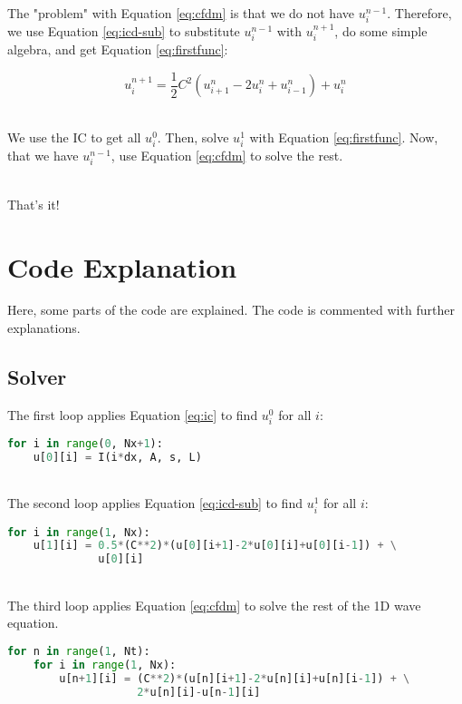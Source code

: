 \documentclass{article}
\begin{document}
\noindent\\The "problem" with Equation \ref{eq:cfdm} is that we do not have $u_i^{n-1}$. Therefore, we use Equation \ref{eq:icd-sub} to substitute $u_i^{n-1}$ with $u_i^{n+1}$, do some simple algebra, and get Equation \ref{eq:firstfunc}:

\begin{equation}
    u_i^{n+1}=\frac{1}{2}C^2\left(u_{i+1}^n-2u_i^n+u_{i-1}^n\right)+u_i^n
    \label{eq:firstfunc}
\end{equation}

\noindent\\We use the IC to get all $u_i^0$. Then, solve $u_i^{1}$ with Equation \ref{eq:firstfunc}. Now, that we have $u_i^{n-1}$, use Equation \ref{eq:cfdm} to solve the rest.

\noindent\\That's it!

\newpage
\section{Code Explanation}
Here, some parts of the code are explained. The code is commented with further explanations.

\subsection{Solver}
The first loop applies Equation \ref{eq:ic} to find $u_i^0$ for all $i$:

\begin{lstlisting}[language=Python, caption=Initial Condition]
for i in range(0, Nx+1):
    u[0][i] = I(i*dx, A, s, L)
\end{lstlisting}

\noindent\\The second loop applies Equation \ref{eq:icd-sub} to find $u_i^1$ for all $i$:

\begin{lstlisting}[language=Python, caption=Initial Condition]
for i in range(1, Nx):
    u[1][i] = 0.5*(C**2)*(u[0][i+1]-2*u[0][i]+u[0][i-1]) + \
              u[0][i]
\end{lstlisting}

\noindent\\The third loop applies Equation \ref{eq:cfdm} to solve the rest of the 1D wave equation.

\begin{lstlisting}[language=Python, caption=Initial Condition]
for n in range(1, Nt):
    for i in range(1, Nx):
        u[n+1][i] = (C**2)*(u[n][i+1]-2*u[n][i]+u[n][i-1]) + \
                    2*u[n][i]-u[n-1][i]
\end{lstlisting}
\end{document}
